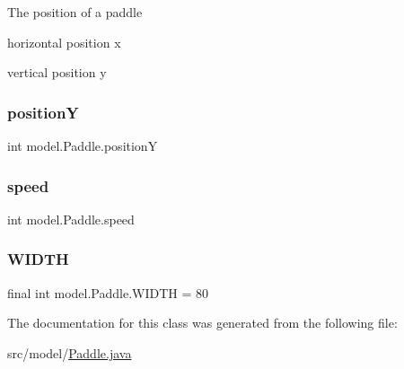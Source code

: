 The position of a paddle
\begin{DoxyItemize}
\item horizontal position x
\item vertical position y 
\end{DoxyItemize}\hypertarget{classmodel_1_1_paddle_a2eafef3f566f1c9c029c4055865cb8be}{}\label{classmodel_1_1_paddle_a2eafef3f566f1c9c029c4055865cb8be} 
\subsubsection{\texorpdfstring{positionY}{positionY}}
{\footnotesize\ttfamily int model.\+Paddle.\+positionY\hspace{0.3cm}{\ttfamily [private]}}

\hypertarget{classmodel_1_1_paddle_a016b48ba6ccdf1cdfc0c11601a6b2a8e}{}\label{classmodel_1_1_paddle_a016b48ba6ccdf1cdfc0c11601a6b2a8e} 
\subsubsection{\texorpdfstring{speed}{speed}}
{\footnotesize\ttfamily int model.\+Paddle.\+speed\hspace{0.3cm}{\ttfamily [private]}}

\hypertarget{classmodel_1_1_paddle_a960e83432472e421bd4c5fb3c594e93f}{}\label{classmodel_1_1_paddle_a960e83432472e421bd4c5fb3c594e93f} 
\subsubsection{\texorpdfstring{W\+I\+D\+TH}{WIDTH}}
{\footnotesize\ttfamily final int model.\+Paddle.\+W\+I\+D\+TH = 80\hspace{0.3cm}{\ttfamily [private]}}



The documentation for this class was generated from the following file\+:\begin{DoxyCompactItemize}
\item 
src/model/\hyperlink{_paddle_8java}{Paddle.\+java}\end{DoxyCompactItemize}

